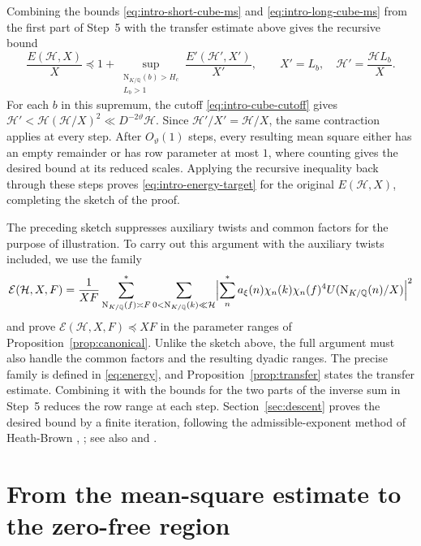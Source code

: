 \documentclass[11pt,a4paper]{article}
\numberwithin{equation}{section}
\numberwithin{figure}{section}
\theoremstyle{definition}
\theoremstyle{remark}
\newcommand{\Q}{\mathbb Q}
\newcommand{\NK}{\mathrm N_{K/\Q}}
\newcommand{\precbd}{\preccurlyeq}
\begin{document}
Combining the bounds \eqref{eq:intro-short-cube-ms} and
\eqref{eq:intro-long-cube-ms} from the first part of Step~5 with
the transfer estimate above gives the recursive bound
\[
 \frac{E(\mathcal H,X)}{X}
 \precbd 1+\sup_{\substack{\NK(b)>H_c\\L_b>1}}\frac{E'(\mathcal H',X')}{X'},
 \qquad X'=L_b,\quad \mathcal H'=\frac{\mathcal H L_b}{X}.
\]
For each $b$ in this supremum, the cutoff \eqref{eq:intro-cube-cutoff}
gives $\mathcal H'<\mathcal H(\mathcal H/X)^2
\ll D^{-2\vartheta}\mathcal H$.
Since $\mathcal H'/X'=\mathcal H/X$, the same contraction applies
at every step. After $O_\vartheta(1)$ steps, every resulting mean
square either has an empty remainder or has row parameter at most $1$,
where counting gives the desired bound at its reduced scales.
Applying the recursive inequality back through these steps proves
\eqref{eq:intro-energy-target} for the original $E(\mathcal H,X)$,
completing the sketch of the proof.

The preceding sketch suppresses auxiliary twists and common factors for the purpose of illustration. To carry out this argument with the auxiliary twists included, we use the family
\[
 \mathcal E(\mathcal H,X,F)
 =\frac1{XF}\sum_{\NK(f)\asymp F}^*
   \sum_{0<\NK(k)\ll\mathcal H}
 \Bigl|\sum_n^*a_\xi(n)\chi_n(k)\chi_n(f)^4
                      U(\NK(n)/X)\Bigr|^2
\]
and prove $\mathcal E(\mathcal H,X,F)\precbd XF$ in the parameter
ranges of Proposition~\ref{prop:canonical}. Unlike the sketch above, the full
argument must also handle the common factors and the resulting dyadic
ranges.
The precise family is defined in \eqref{eq:energy}, and
Proposition~\ref{prop:transfer} states the transfer estimate.
Combining it with the bounds for the two parts of
the inverse sum in Step~5 reduces the row range at each step.
Section~\ref{sec:descent} proves the desired bound by a finite iteration,
following the admissible-exponent method of Heath-Brown
\cite[Lemma~8 and \S8]{HB95}, \cite[Lemma~9]{HB00}; see also
\cite[Theorem~4.1]{GL} and \cite[\S3.2]{BGL}.

\section{From the mean-square estimate to the zero-free region}\label{sec:reduction}
\end{document}
